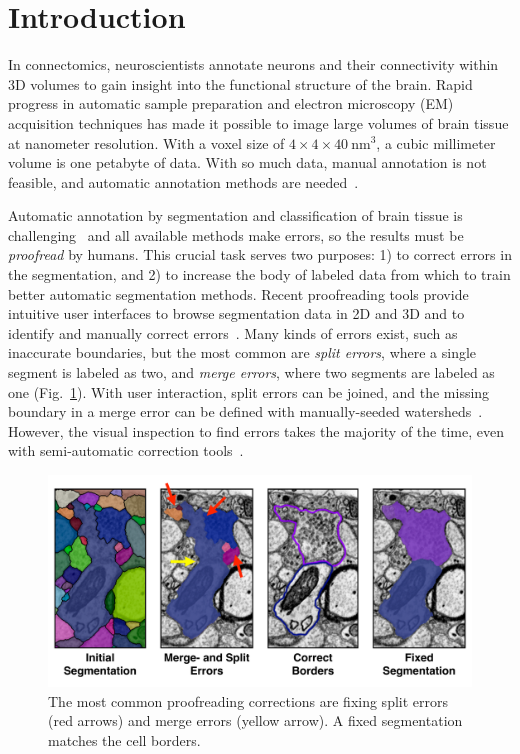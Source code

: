 \section{Introduction}

In connectomics, neuroscientists annotate neurons and their connectivity within
3D volumes to gain insight into the functional structure of the brain. Rapid
progress in automatic sample preparation and electron microscopy (EM)
acquisition techniques has made it possible to image large volumes of brain
tissue at nanometer resolution. With a voxel size of
$4\times4\times40~\text{nm}^3$, a cubic millimeter volume is one petabyte of
data. With so much data, manual annotation is not feasible, and automatic
annotation methods are needed~\cite{jain2010,Liu2014,GALA2014,kaynig2015large}.

Automatic annotation by segmentation and classification of brain tissue is
challenging~\cite{isbi_challenge} and all available methods make errors, so 
the results must be \emph{proofread} by humans. This crucial
task serves two purposes: 1) to correct errors in the segmentation, and 2) to
increase the body of labeled data from which to train better automatic
segmentation methods. Recent proofreading tools provide intuitive user
interfaces to browse segmentation data in 2D and 3D and to identify and manually
correct errors~\cite{markus_proofreading,raveler,mojo2,haehn_dojo_2014}. Many
kinds of errors exist, such as inaccurate boundaries, but the most common are
\emph{split errors}, where a single segment is labeled as two, and \emph{merge
errors}, where two segments are labeled as one
(Fig.~\ref{fig:merge_and_slit_errors}). With user interaction, split errors can
be joined, and the missing boundary in a merge error can be defined with
manually-seeded watersheds~\cite{haehn_dojo_2014}. However, the visual
inspection to find errors takes the majority of the time, even with
semi-automatic correction tools~\cite{proofreading_bottleneck}.

\begin{figure}[t]
\begin{center}
  \includegraphics[width=\linewidth]{merge_and_split_errors.pdf}
\end{center}
\vspace{-4mm}
   \caption{The most common proofreading corrections are fixing split errors (red arrows) and merge errors (yellow arrow). A fixed segmentation matches the cell borders.}
\label{fig:merge_and_slit_errors}
\end{figure}

